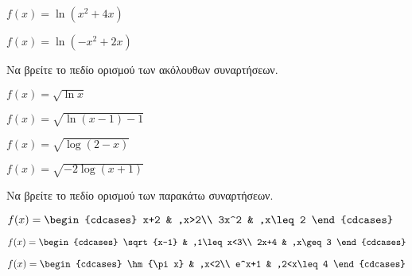 \documentclass[11pt,a4paper,twocolumn]{article}
\begin{document}
\begin{askhseis}
\begin{alist}
\item $f(x)=\ln{(x^2+4x)}$
\item $f(x)=\ln{(-x^2+2x)}$
\end{alist}
\item Να βρείτε το πεδίο ορισμού των ακόλουθων συναρτήσεων.
\begin{alist}
\item $f(x)=\sqrt{\ln{x}}$
\item $f(x)=\sqrt{\ln{(x-1)-1}}$
\item $f(x)=\sqrt{\log{(2-x)}}$
\item $f(x)=\sqrt{-2\log{(x+1)}}$
\end{alist}
\item Να βρείτε το πεδίο ορισμού των παρακάτω συναρτήσεων.
\begin{alist}
\item $f(x)=\begin{cdcases}
x+2 & ,x>2\\ 3x^2 & ,x\leq 2
\end{cdcases}$
\item $f(x)=\begin{cdcases}
\sqrt{x-1} & ,1\leq x<3\\ 2x+4 & ,x\geq 3
\end{cdcases}$
\item $f(x)=\begin{cdcases}
\hm{\pi x} & ,x<2\\ e^x+1 & ,2<x\leq 4
\end{cdcases}$
\end{alist}
\end{askhseis}
\end{document}
